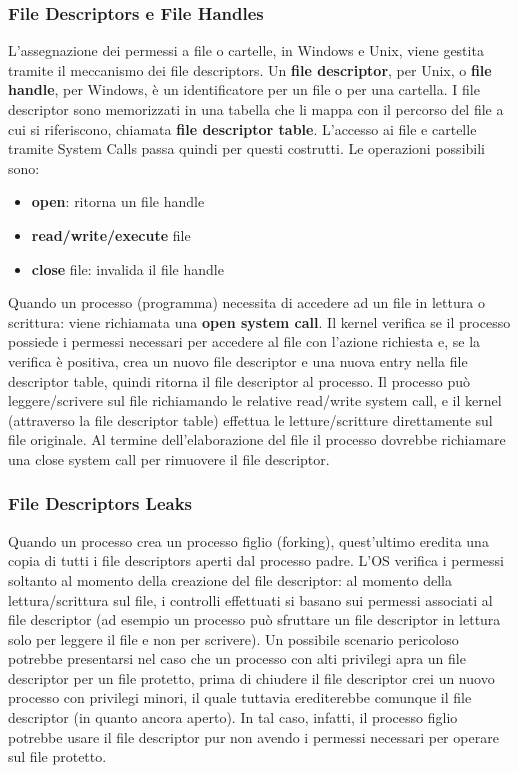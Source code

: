 \subsubsection{File Descriptors e File Handles}
L'assegnazione dei permessi a file o cartelle, in Windows e Unix, viene gestita tramite il meccanismo dei file descriptors. Un \textbf{file descriptor}, per Unix, o \textbf{file handle}, per Windows, è un identificatore per un file o per una cartella. I file descriptor sono memorizzati in una tabella che li mappa con il percorso del file a cui si riferiscono, chiamata \textbf{file descriptor table}. L'accesso ai file e cartelle tramite System Calls passa quindi per questi costrutti. Le operazioni possibili sono:
\begin{itemize}
  \item \textbf{open}: ritorna un file handle
  \item \textbf{read/write/execute} file
  \item \textbf{close} file: invalida il file handle
\end{itemize}
Quando un processo (programma) necessita di accedere ad un file in lettura o scrittura: viene richiamata una \textbf{open system call}. Il kernel verifica se il processo possiede i permessi necessari per accedere al file con l'azione richiesta e, se la verifica è positiva, crea un nuovo file descriptor e una nuova entry nella file descriptor table, quindi ritorna il file descriptor al processo. Il processo può leggere/scrivere sul file richiamando le relative
read/write system call, e il kernel (attraverso la file descriptor table) effettua le letture/scritture direttamente sul file originale. Al termine dell'elaborazione del file il processo dovrebbe richiamare una close system call
per rimuovere il file descriptor.

\subsubsection{File Descriptors Leaks}
Quando un processo crea un processo figlio (forking), quest'ultimo eredita una copia di tutti i file descriptors aperti dal processo padre. L'OS verifica i permessi soltanto al momento della creazione del file descriptor: al momento della lettura/scrittura sul file, i controlli effettuati si basano sui permessi associati al file descriptor (ad esempio un processo può sfruttare un file descriptor in lettura solo per leggere il file e non per scrivere). Un possibile scenario pericoloso potrebbe presentarsi nel caso che un processo con alti privilegi apra un file descriptor per un file protetto, prima di chiudere il file descriptor crei un nuovo processo con privilegi minori, il quale tuttavia erediterebbe comunque il file descriptor (in quanto ancora aperto). In tal caso, infatti, il processo figlio potrebbe usare il file descriptor pur non avendo i permessi necessari per operare sul file protetto.

